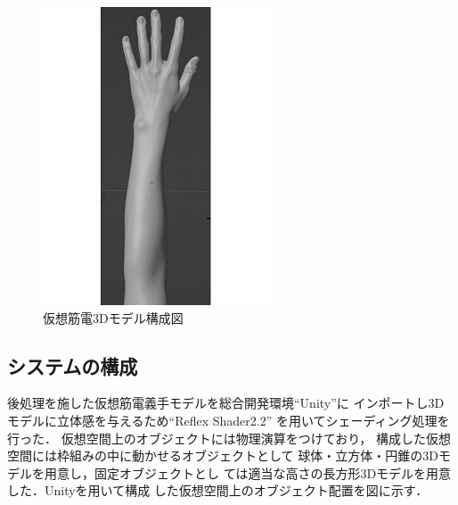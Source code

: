 \documentclass{ltjsarticle}
\begin{document}
\begin{figure}[H]
\begin{minipage}{0.26\columnwidth}
		\end{minipage}
		\hspace{0.1\columnwidth}
		\begin{minipage}{0.4\columnwidth}
		\centering
		\includegraphics[width = \columnwidth]{figs/handmesh_rear2.png}
		\end{minipage}
		\caption{仮想筋電3Dモデル構成図}
		\label{fig:VRhand}
		\end{figure}
		\vspace{-30pt}

	\subsection{システムの構成}
		後処理を施した仮想筋電義手モデルを総合開発環境``Unity''に
		インポートし3Dモデルに立体感を与えるため``Reflex Shader2.2''
		を用いてシェーディング処理を行った．
		仮想空間上のオブジェクトには物理演算をつけており，
		構成した仮想空間には枠組みの中に動かせるオブジェクトとして
		球体・立方体・円錐の3Dモデルを用意し，固定オブジェクトとし
		ては適当な高さの長方形3Dモデルを用意した．Unityを用いて構成
		した仮想空間上のオブジェクト配置を図に示す．
\end{document}
